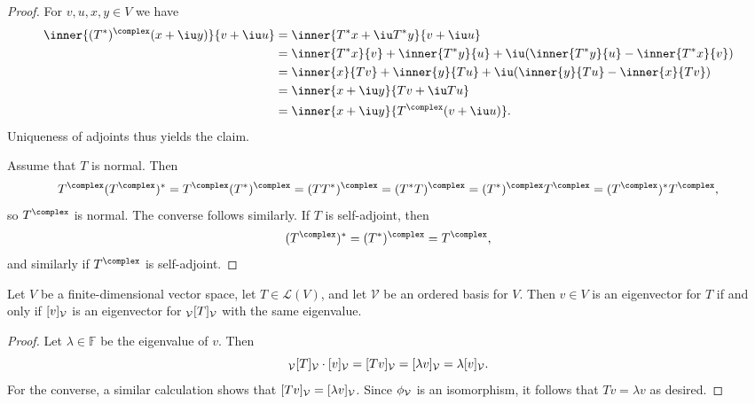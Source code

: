 \documentclass[article, a4paper, 11pt, oneside]{memoir}
\numberwithin{equation}{chapter}
\newcommand{\calL}{\mathcal{L}}
\newcommand{\calV}{\mathcal{V}}
\newcommand{\field}{\mathbb{F}}
\begin{document}
\begin{proof}
    For $v,u,x,y \in V$ we have
    \begin{align*}
        \inner{(T^*)^\complex(x + \iu y)}{v + \iu u}
            &= \inner{ T^*x + \iu T^*y }{v + \iu u} \\
            &= \inner{T^*x}{v}
                + \inner{T^*y}{u}
                + \iu ( \inner{T^*y}{u} - \inner{T^*x}{v} ) \\
            &= \inner{x}{Tv}
                + \inner{y}{Tu}
                + \iu ( \inner{y}{Tu} - \inner{x}{Tv} ) \\
            &= \inner{x + \iu y}{Tv + \iu Tu} \\
            &= \inner{x + \iu y}{T^\complex(v + \iu u)}.
    \end{align*}
    Uniqueness of adjoints thus yields the claim.

    Assume that $T$ is normal. Then
    \begin{equation*}
        T^\complex (T^\complex)^*
            = T^\complex (T^*)^\complex
            = (TT^*)^\complex
            = (T^*T)^\complex
            = (T^*)^\complex T^\complex
            = (T^\complex)^* T^\complex,
    \end{equation*}
    so $T^\complex$ is normal. The converse follows similarly. If $T$ is self-adjoint, then
    \begin{equation*}
        (T^\complex)^*
            = (T^*)^\complex
            = T^\complex,
    \end{equation*}
    and similarly if $T^\complex$ is self-adjoint.
\end{proof}


\begin{lemma}
    \label{lemma:mr-eigenvalues}
    Let $V$ be a finite-dimensional vector space, let $T \in \calL(V)$, and let $\calV$ be an ordered basis for $V$. Then $v \in V$ is an eigenvector for $T$ if and only if $\coordvec{v}{\calV}$ is an eigenvector for $\mr{\calV}{T}{\calV}$ with the same eigenvalue.
\end{lemma}

\begin{proof}
    Let $\lambda \in \field$ be the eigenvalue of $v$. Then
    \begin{equation*}
        \mr{\calV}{T}{\calV} \cdot \coordvec{v}{\calV}
            = \coordvec{Tv}{\calV}
            = \coordvec{\lambda v}{\calV}
            = \lambda \coordvec{v}{\calV}.
    \end{equation*}
    For the converse, a similar calculation shows that  $\coordvec{Tv}{\calV} = \coordvec{\lambda v}{\calV}$. Since $\coordmap{\calV}$ is an isomorphism, it follows that $Tv = \lambda v$ as desired.
\end{proof}
\end{document}
